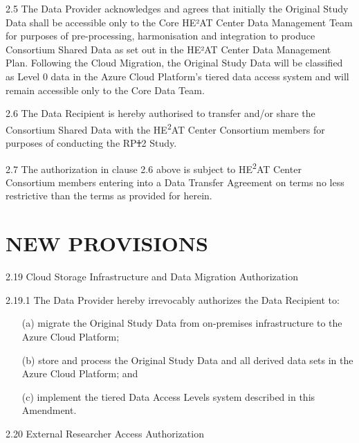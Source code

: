 \documentclass[12pt,letterpaper]{article}
\newcommand{\deleted}[1]{\textcolor{deletecolor}{\sout{#1}}}
\newcommand{\added}[1]{\textcolor{addcolor}{#1}}
\begin{document}
2.5 The Data Provider acknowledges and agrees that initially the Original Study Data shall be accessible only to the Core \added{HE²AT Center Data Management} Team for purposes of pre-processing, harmonisation and integration to produce Consortium Shared Data as set out in the HE²AT Center Data Management Plan. \added{Following the Cloud Migration, the Original Study Data will be classified as Level 0 data in the Azure Cloud Platform's tiered data access system and will remain accessible only to the Core Data Team.}

2.6 The Data Recipient is hereby authorised to transfer and/or share the Consortium Shared Data with the HE\textsuperscript{2}AT Center Consortium members for purposes of conducting the RP\deleted{1}\added{2} Study.

2.7 The authorization in clause 2.6 above is subject to HE\textsuperscript{2}AT Center Consortium members entering into a Data Transfer Agreement on terms no less restrictive than the terms as provided for herein.

\section{NEW PROVISIONS}

\added{2.19 Cloud Storage Infrastructure and Data Migration Authorization}

\added{2.19.1 The Data Provider hereby irrevocably authorizes the Data Recipient to:
\begin{itemize}
\item[(a)] migrate the Original Study Data from on-premises infrastructure to the Azure Cloud Platform;
\item[(b)] store and process the Original Study Data and all derived data sets in the Azure Cloud Platform; and
\item[(c)] implement the tiered Data Access Levels system described in this Amendment.
\end{itemize}}

\added{2.20 External Researcher Access Authorization}
\end{document}
